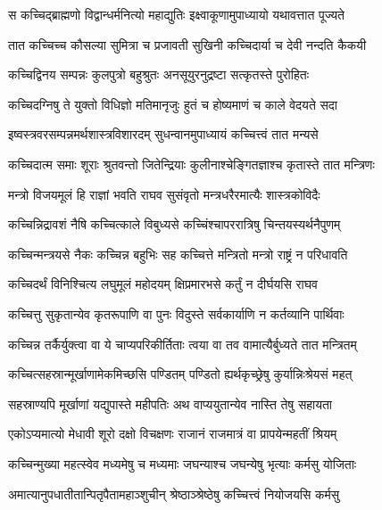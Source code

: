 \twolineshloka
{स कच्चिद्ब्राह्मणो विद्वान्धर्मनित्यो महाद्युतिः}
{इक्ष्वाकूणामुपाध्यायो यथावत्तात पूज्यते} %

\twolineshloka
{तात कच्चिच्च कौसल्या सुमित्रा च प्रजावती}
{सुखिनी कच्चिदार्या च देवी नन्दति कैकयी} %

\twolineshloka
{कच्चिद्विनय सम्पन्नः कुलपुत्रो बहुश्रुतः}
{अनसूयुरनुद्रष्टा सत्कृतस्ते पुरोहितः} %

\twolineshloka
{कच्चिदग्निषु ते युक्तो विधिज्ञो मतिमानृजुः}
{हुतं च होष्यमाणं च काले वेदयते सदा} %

\twolineshloka
{इष्वस्त्रवरसम्पन्नमर्थशास्त्रविशारदम्}
{सुधन्वानमुपाध्यायं कच्चित्त्वं तात मन्यसे} %

\twolineshloka
{कच्चिदात्म समाः शूराः श्रुतवन्तो जितेन्द्रियाः}
{कुलीनाश्चेङ्गितज्ञाश्च कृतास्ते तात मन्त्रिणः} %

\twolineshloka
{मन्त्रो विजयमूलं हि राज्ञां भवति राघव}
{सुसंवृतो मन्त्रधरैरमात्यैः शास्त्रकोविदैः} %

\twolineshloka
{कच्चिन्निद्रावशं नैषि कच्चित्काले विबुध्यसे}
{कच्चिंश्चापररात्रिषु चिन्तयस्यर्थनैपुणम्} %

\twolineshloka
{कच्चिन्मन्त्रयसे नैकः कच्चिन्न बहुभिः सह}
{कच्चित्ते मन्त्रितो मन्त्रो राष्ट्रं न परिधावति} %

\twolineshloka
{कच्चिदर्थं विनिश्चित्य लघुमूलं महोदयम्}
{क्षिप्रमारभसे कर्तुं न दीर्घयसि राघव} %

\twolineshloka
{कच्चित्तु सुकृतान्येव कृतरूपाणि वा पुनः}
{विदुस्ते सर्वकार्याणि न कर्तव्यानि पार्थिवाः} %

\twolineshloka
{कच्चिन्न तर्कैर्युक्त्वा वा ये चाप्यपरिकीर्तिताः}
{त्वया वा तव वामात्यैर्बुध्यते तात मन्त्रितम्} %

\twolineshloka
{कच्चित्सहस्रान्मूर्खाणामेकमिच्छसि पण्डितम्}
{पण्डितो ह्यर्थकृच्छ्रेषु कुर्यान्निःश्रेयसं महत्} %

\twolineshloka
{सहस्राण्यपि मूर्खाणां यद्युपास्ते महीपतिः}
{अथ वाप्ययुतान्येव नास्ति तेषु सहायता} %

\twolineshloka
{एकोऽप्यमात्यो मेधावी शूरो दक्षो विचक्षणः}
{राजानं राजमात्रं वा प्रापयेन्महतीं श्रियम्} %

\twolineshloka
{कच्चिन्मुख्या महत्स्वेव मध्यमेषु च मध्यमाः}
{जघन्याश्च जघन्येषु भृत्याः कर्मसु योजिताः} %

\twolineshloka
{अमात्यानुपधातीतान्पितृपैतामहाञ्शुचीन्}
{श्रेष्ठाञ्श्रेष्ठेषु कच्चित्त्वं नियोजयसि कर्मसु} %

